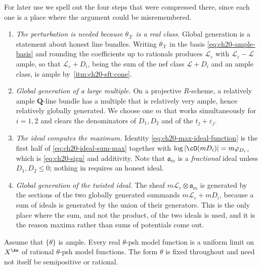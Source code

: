 For later use we spell out the four steps that were compressed there, since
each one is a place where the argument could be misremembered.

\begin{enumerate}
\item \emph{The perturbation is needed because $\theta_{\mathcal X}$ is a
 real class.}  Global generation is a statement about honest line bundles.
 Writing $\theta_{\mathcal X}$ in the basis \eqref{eq:ch20-ample-basis}
 and rounding the coefficients up to rationals produces
 $\mathcal L_\varepsilon$ with $\mathcal L_\varepsilon-\mathcal L$
 ample, so that $\mathcal L_\varepsilon+D_i$, being the sum of the nef
 class $\mathcal L+D_i$ and an ample class, is ample by
 \,\cref{itm:ch20-sft:cone}.
\item \emph{Global generation of a large multiple.}  On a projective
 $R$-scheme, a relatively ample $\mathbf Q$-line bundle has a multiple
 that is relatively very ample, hence relatively globally generated.  We
 choose one $m$ that works simultaneously for $i=1,2$ and clears the
 denominators of $D_1,D_2$ and of the $t_j+\varepsilon_j$.
\item \emph{The ideal computes the maximum.}  Identity
 \eqref{eq:ch20-max-ideal-function} is the first half of
 \eqref{eq:ch20-ideal-sum-max} together with
 $\log|\cO(mD_i)|=m\varphi_{D_i}$, which is
 \eqref{eq:ch20-sign} and additivity.  Note that
 $\mathfrak a_m$ is a \emph{fractional} ideal unless $D_1,D_2\leq0$;
 nothing in  requires an honest ideal.
\item \emph{Global generation of the twisted ideal.}  The sheaf
 $m\mathcal L_\varepsilon\otimes\mathfrak a_m$ is generated by the
 sections of the two globally generated summands
 $m\mathcal L_\varepsilon+mD_i$, because a sum of ideals is generated by
 the union of their generators.  This is the only place where the sum, and
 not the product, of the two ideals is used, and it is the reason maxima
 rather than sums of potentials come out.
\end{enumerate}

\begin{lemma}
\label{lem:ch20-fixed-form-rational-approximation}
Assume that $\{\theta\}$ is ample.  Every real $\theta$-psh model
function is a uniform limit on $X^{\An}$ of rational $\theta$-psh model
functions.  The form $\theta$ is fixed throughout and need not itself be
semipositive or rational.
\end{lemma}

